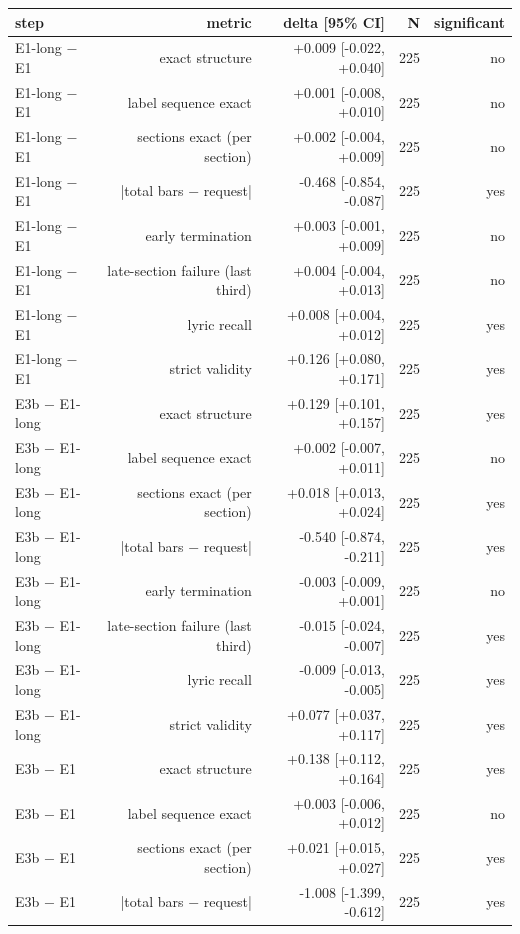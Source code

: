 \begin{table}[t]
\centering
\small
\begin{tabular}{lrrrr}
\toprule
step & metric & delta [95\% CI] & N & significant \\
\midrule
E1-long $-$ E1 & exact structure & +0.009 [-0.022, +0.040] & 225 & no \\
E1-long $-$ E1 & label sequence exact & +0.001 [-0.008, +0.010] & 225 & no \\
E1-long $-$ E1 & sections exact (per section) & +0.002 [-0.004, +0.009] & 225 & no \\
E1-long $-$ E1 & |total bars $-$ request| & -0.468 [-0.854, -0.087] & 225 & yes \\
E1-long $-$ E1 & early termination & +0.003 [-0.001, +0.009] & 225 & no \\
E1-long $-$ E1 & late-section failure (last third) & +0.004 [-0.004, +0.013] & 225 & no \\
E1-long $-$ E1 & lyric recall & +0.008 [+0.004, +0.012] & 225 & yes \\
E1-long $-$ E1 & strict validity & +0.126 [+0.080, +0.171] & 225 & yes \\
E3b $-$ E1-long & exact structure & +0.129 [+0.101, +0.157] & 225 & yes \\
E3b $-$ E1-long & label sequence exact & +0.002 [-0.007, +0.011] & 225 & no \\
E3b $-$ E1-long & sections exact (per section) & +0.018 [+0.013, +0.024] & 225 & yes \\
E3b $-$ E1-long & |total bars $-$ request| & -0.540 [-0.874, -0.211] & 225 & yes \\
E3b $-$ E1-long & early termination & -0.003 [-0.009, +0.001] & 225 & no \\
E3b $-$ E1-long & late-section failure (last third) & -0.015 [-0.024, -0.007] & 225 & yes \\
E3b $-$ E1-long & lyric recall & -0.009 [-0.013, -0.005] & 225 & yes \\
E3b $-$ E1-long & strict validity & +0.077 [+0.037, +0.117] & 225 & yes \\
E3b $-$ E1 & exact structure & +0.138 [+0.112, +0.164] & 225 & yes \\
E3b $-$ E1 & label sequence exact & +0.003 [-0.006, +0.012] & 225 & no \\
E3b $-$ E1 & sections exact (per section) & +0.021 [+0.015, +0.027] & 225 & yes \\
E3b $-$ E1 & |total bars $-$ request| & -1.008 [-1.399, -0.612] & 225 & yes \\

\end{tabular}
\end{table}
